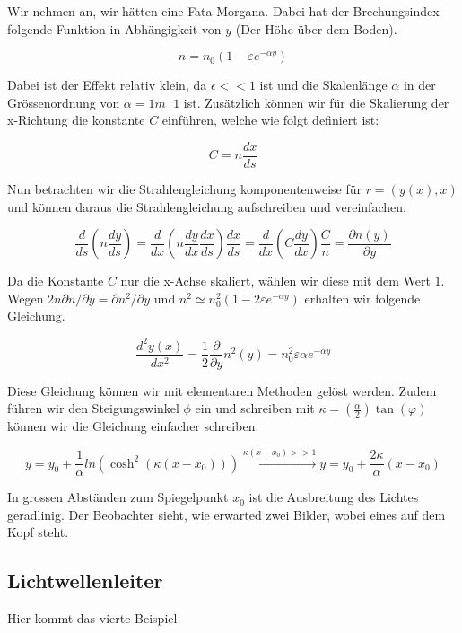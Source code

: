 Wir nehmen an, wir hätten eine Fata Morgana. 
Dabei hat der Brechungsindex folgende Funktion in Abhängigkeit von $y$ 
(Der Höhe über dem Boden).

\[
n = n_0 (1 - \varepsilon e^{- \alpha y})
\]

Dabei ist der Effekt relativ klein, da $\epsilon << 1$ ist und 
die Skalenlänge $\alpha$ in der Grössenordnung von $\alpha = 1 m^-1$ ist.
Zusätzlich können wir für die Skalierung der x-Richtung die konstante $C$ einführen,
welche wie folgt definiert ist:

\[
C = n \frac{dx}{ds}
\]

Nun betrachten wir die Strahlengleichung komponentenweise für $r = (y(x), x)$ 
und können daraus die Strahlengleichung aufschreiben und vereinfachen.

\[
\frac{d}{ds} \left ( n \frac{dy}{ds} \right ) =
\frac{d}{dx} \left ( n \frac{dy}{dx} \frac{dx}{ds} \right ) \frac{dx}{ds} =
\frac{d}{dx} \left ( C \frac{dy}{dx} \right ) \frac{C}{n} =
\frac{\partial n(y)}{\partial y}
\]

Da die Konstante $C$ nur die x-Achse skaliert, wählen wir diese mit dem Wert $1$.
Wegen $2 n \partial n / \partial y = \partial n^2 / \partial y$ und 
$n^2 \simeq n_0^2(1 - 2 \varepsilon e^{-\alpha y})$ erhalten wir folgende Gleichung.

\[
\frac{d^2 y(x)}{dx^2} =
\frac{1}{2} \frac{\partial}{\partial y} n^2(y) =
n_0^2 \varepsilon \alpha e^{-\alpha y}
\]

Diese Gleichung können wir mit elementaren Methoden gelöst werden. 
Zudem führen wir den Steigungswinkel $\phi$ ein und schreiben mit 
$\kappa = (\frac{\alpha}{2}) \tan(\varphi)$ können wir die Gleichung einfacher schreiben.

\[
y =
y_0 + \frac{1}{\alpha} ln(\cosh^2(\kappa(x - x_0))) \xrightarrow{\kappa (x - x_0 ) >> 1}
y =
y_0 + \frac{2 \kappa}{\alpha} (x - x_0)
\]

In grossen Abständen zum Spiegelpunkt $x_0$ ist die Ausbreitung des Lichtes geradlinig.
Der Beobachter sieht, wie erwarted zwei Bilder, wobei eines auf dem Kopf steht.

\subsection{Lichtwellenleiter}

Hier kommt das vierte Beispiel.